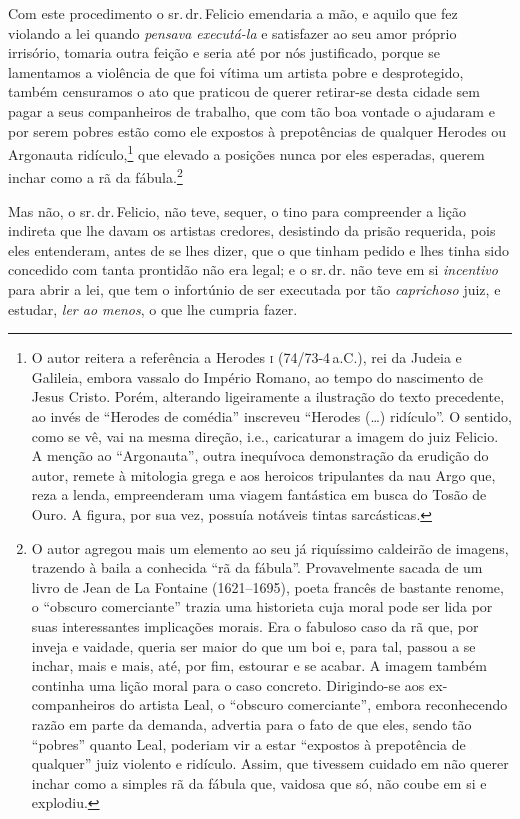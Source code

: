 Com este procedimento o sr.\,dr.\,Felicio emendaria a mão, e aquilo que
fez violando a lei quando \emph{pensava executá-la} e satisfazer ao seu
amor próprio irrisório, tomaria outra feição e seria até por nós
justificado, porque se lamentamos a violência de que foi vítima um
artista pobre e desprotegido, também censuramos o ato que praticou de
querer retirar-se desta cidade sem pagar a seus companheiros de
trabalho, que com tão boa vontade o ajudaram e por serem pobres estão
como ele expostos à prepotências de qualquer Herodes ou Argonauta
ridículo,\footnote{ O autor reitera a referência a Herodes \textsc{i} (74/73-4\,a.C.), 
rei da Judeia e Galileia, embora vassalo do Império
  Romano, ao tempo do nascimento de Jesus Cristo. Porém, alterando
  ligeiramente a ilustração do texto precedente, ao invés de ``Herodes de
  comédia'' inscreveu ``Herodes (\ldots{}) ridículo''. O sentido, como se vê,
  vai na mesma direção, i.e., caricaturar a imagem do juiz Felicio. A
  menção ao ``Argonauta'', outra inequívoca demonstração da erudição do
  autor, remete à mitologia grega e aos heroicos tripulantes da nau Argo
  que, reza a lenda, empreenderam uma viagem fantástica em busca do
  Tosão de Ouro. A figura, por sua vez, possuía notáveis tintas
  sarcásticas.} que elevado a posições nunca por eles esperadas, querem
inchar como a rã da fábula.\footnote{ O autor agregou mais um elemento
  ao seu já riquíssimo caldeirão de imagens, trazendo à baila a
  conhecida ``rã da fábula''. Provavelmente sacada de um livro de Jean de
  La Fontaine (1621--1695), poeta francês de bastante renome, o ``obscuro
  comerciante'' trazia uma historieta cuja moral pode ser lida por suas
  interessantes implicações morais. Era o fabuloso caso da rã que, por
  inveja e vaidade, queria ser maior do que um boi e, para tal, passou a
  se inchar, mais e mais, até, por fim, estourar e se acabar. A imagem
  também continha uma lição moral para o caso concreto. Dirigindo-se aos
  ex-companheiros do artista Leal, o ``obscuro comerciante'', embora
  reconhecendo razão em parte da demanda, advertia para o fato de que
  eles, sendo tão ``pobres'' quanto Leal, poderiam vir a estar ``expostos à
  prepotência de qualquer'' juiz violento e ridículo. Assim, que tivessem
  cuidado em não querer inchar como a simples rã da fábula que, vaidosa
  que só, não coube em si e explodiu.}

Mas não, o sr.\,dr.\,Felicio, não teve, sequer, o tino para compreender a
lição indireta que lhe davam os artistas credores, desistindo da prisão
requerida, pois eles entenderam, antes de se lhes dizer, que o que
tinham pedido e lhes tinha sido concedido com tanta prontidão não era
legal; e o sr.\,dr. não teve em si \emph{incentivo} para abrir a lei, que
tem o infortúnio de ser executada por tão \emph{caprichoso} juiz, e
estudar, \emph{ler ao menos}, o que lhe cumpria fazer.

